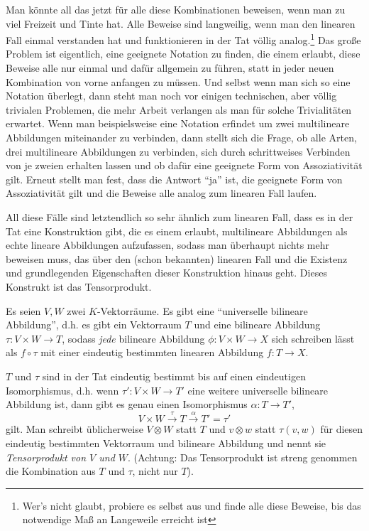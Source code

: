 \begin{remark}
\medbreak
Man könnte all das jetzt für alle diese Kombinationen beweisen, wenn man zu viel Freizeit und Tinte hat. Alle Beweise sind langweilig, wenn man den linearen Fall einmal verstanden hat und funktionieren in der Tat völlig analog.\footnote{Wer's nicht glaubt, probiere es selbst aus und finde alle diese Beweise, bis das notwendige Maß an Langeweile erreicht ist} Das große Problem ist eigentlich, eine geeignete Notation zu finden, die einem erlaubt, diese Beweise alle nur einmal und dafür allgemein zu führen, statt in jeder neuen Kombination von vorne anfangen zu müssen. Und selbst wenn man sich so eine Notation überlegt, dann steht man noch vor einigen technischen, aber völlig trivialen Problemen, die mehr Arbeit verlangen als man für solche Trivialitäten erwartet. Wenn man beispielsweise eine Notation erfindet um zwei multilineare Abbildungen miteinander zu verbinden, dann stellt sich die Frage, ob alle Arten, drei multilineare Abbildungen zu verbinden, sich durch schrittweises Verbinden von je zweien erhalten lassen und ob dafür eine geeignete Form von Assoziativität gilt. Erneut stellt man fest, dass die Antwort \enquote{ja} ist, die geeignete Form von Assoziativität gilt und die Beweise alle analog zum linearen Fall laufen.
\end{remark}

\begin{remark}
All diese Fälle sind letztendlich so sehr ähnlich zum linearen Fall, dass es in der Tat eine Konstruktion gibt, die es einem erlaubt, multilineare Abbildungen als echte lineare Abbildungen aufzufassen, sodass man überhaupt nichts mehr beweisen muss, das über den (schon bekannten) linearen Fall und die Existenz und grundlegenden Eigenschaften dieser Konstruktion hinaus geht. Dieses Konstrukt ist das Tensorprodukt.
\end{remark}

\begin{theoremdef}\label{tensorprodukt:def}
Es seien $V,W$ zwei $K$-Vektorräume. Es gibt eine \enquote{universelle bilineare Abbildung}, d.h. es gibt ein Vektorraum $T$ und eine bilineare Abbildung $\tau: V\times W\to T$, sodass \textit{jede} bilineare Abbildung $\phi: V\times W \to X$ sich schreiben lässt als $f\circ\tau$ mit einer eindeutig bestimmten linearen Abbildung $f: T\to X$.

\medbreak
$T$ und $\tau$ sind in der Tat eindeutig bestimmt bis auf einen eindeutigen Isomorphismus, d.h. wenn $\tau':V\times W\to T'$ eine weitere universelle bilineare Abbildung ist, dann gibt es genau einen Isomorphismus $\alpha:T\to T'$, 
\[V\times W \xrightarrow{\tau} T \xrightarrow{\alpha} T' = \tau'\]
gilt. Man schreibt üblicherweise $V\otimes W$ statt $T$ und $v\otimes w$ statt $\tau(v,w)$ für diesen eindeutig bestimmten Vektorraum und bilineare Abbildung und nennt sie \emph{Tensorprodukt von $V$ und $W$}. (Achtung: Das Tensorprodukt ist streng genommen die Kombination aus $T$ und $\tau$, nicht nur $T$).
\end{theoremdef}

